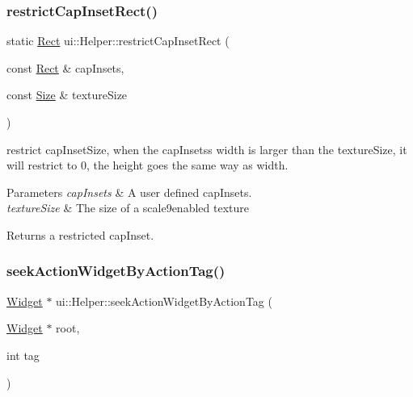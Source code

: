 \subsubsection{\texorpdfstring{restrict\+Cap\+Inset\+Rect()}{restrictCapInsetRect()}\hspace{0.1cm}{\footnotesize\ttfamily [2/2]}}
{\footnotesize\ttfamily static \hyperlink{classRect}{Rect} ui\+::\+Helper\+::restrict\+Cap\+Inset\+Rect (\begin{DoxyParamCaption}\item[{const \hyperlink{classRect}{Rect} \&}]{cap\+Insets,  }\item[{const \hyperlink{classSize}{Size} \&}]{texture\+Size }\end{DoxyParamCaption})\hspace{0.3cm}{\ttfamily [static]}}



restrict cap\+Inset\+Size, when the cap\+Insets\textquotesingle{}s width is larger than the texture\+Size, it will restrict to 0, the height goes the same way as width. 


\begin{DoxyParams}{Parameters}
{\em cap\+Insets} & A user defined cap\+Insets. \\
\hline
{\em texture\+Size} & The size of a scale9enabled texture \\
\hline
\end{DoxyParams}
\begin{DoxyReturn}{Returns}
a restricted cap\+Inset. 
\end{DoxyReturn}
\mbox{\label{classui_1_1Helper_a4ec2c2dfef96d42d88b0ffd3f9d835b7}} 
\subsubsection{\texorpdfstring{seek\+Action\+Widget\+By\+Action\+Tag()}{seekActionWidgetByActionTag()}\hspace{0.1cm}{\footnotesize\ttfamily [1/2]}}
{\footnotesize\ttfamily \hyperlink{classui_1_1Widget}{Widget} $\ast$ ui\+::\+Helper\+::seek\+Action\+Widget\+By\+Action\+Tag (\begin{DoxyParamCaption}\item[{\hyperlink{classui_1_1Widget}{Widget} $\ast$}]{root,  }\item[{int}]{tag }\end{DoxyParamCaption})\hspace{0.3cm}{\ttfamily [static]}}

